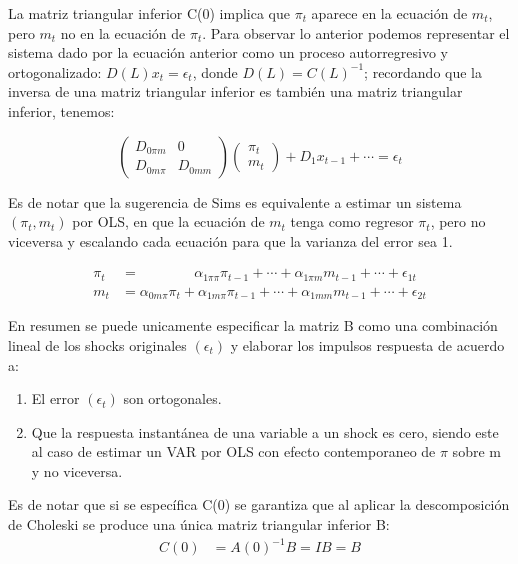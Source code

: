 \documentclass[
]{book}
\providecommand{\tightlist}{%
  \setlength{\itemsep}{0pt}\setlength{\parskip}{0pt}}
\begin{document}
La matriz triangular inferior C(0) implica que \(\pi_{t}\) aparece en la ecuación de \(m_{t}\), pero \(m_{t}\) no en la ecuación de \(\pi_{t}\). Para observar lo anterior podemos representar el sistema dado por la ecuación anterior como un proceso autorregresivo y ortogonalizado: \(D(L)x_{t}=\epsilon_{t}\), donde \(D(L)=C(L)^{-1}\); recordando que la inversa de una matriz triangular inferior es también una matriz triangular inferior, tenemos:

\begin{equation}
      \left( \begin{array}{cc}
      D_{0\pi m} & 0\\
      D_{0m \pi} & D_{0mm}
      \end{array}
      \right)
      \left( \begin{array}{c}
      \pi_{t} \\
       m_{t} 
      \end{array}\right)+D_{1}x_{t-1}+\cdots=\epsilon_{t}\nonumber
\end{equation}

Es de notar que la sugerencia de Sims es equivalente a estimar un sistema \((\pi_{t}, m_{t})\) por OLS, en que la ecuación de \(m_{t}\) tenga como regresor \(\pi_{t}\), pero no viceversa y escalando cada ecuación para que la varianza del error sea 1.

\begin{align}
\pi_{t}&=\;\;\;\;\;\;\;\;\;\;\;\;\;\;\alpha_{1\pi \pi}\pi_{t-1}+\cdots+\alpha_{1\pi m}m_{t-1}+\cdots+\epsilon_{1t}\nonumber \\
m_{t}&=\alpha_{0m \pi}\pi_{t}+\alpha_{1m \pi}\pi_{t-1}+\cdots+\alpha_{1mm}m_{t-1}+\cdots +\epsilon_{2t}\nonumber
\end{align}

En resumen se puede unicamente especificar la matriz B como una combinación lineal de los shocks originales \((\epsilon_{t})\) y elaborar los impulsos respuesta de acuerdo a:

\begin{enumerate}
\def\labelenumi{\arabic{enumi}.}
\tightlist
\item
  El error \((\epsilon_{t})\) son ortogonales.
\item
  Que la respuesta instantánea de una variable a un shock es cero, siendo este al caso de estimar un VAR por OLS con efecto contemporaneo de \(\pi\) sobre m y no viceversa.
\end{enumerate}

Es de notar que si se específica C(0) se garantiza que al aplicar la descomposición de Choleski se produce una única matriz triangular inferior B:
\begin{align}
C(0)&=A(0)^{-1}B=IB=B \nonumber\\
\end{align}
\end{document}
